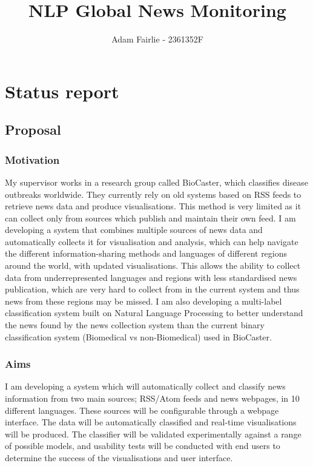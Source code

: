 \documentclass[11pt]{article}
\title{ NLP Global News Monitoring }
\author{ Adam Fairlie - 2361352F }
\begin{document}
    \maketitle
    
    
     

\section{Status report}

\subsection{Proposal}\label{proposal}

\subsubsection{Motivation}\label{motivation}
My supervisor works in a research group called BioCaster, which classifies disease outbreaks worldwide. They currently rely on old systems based on RSS feeds to retrieve news data and produce visualisations. This method is very limited as it can collect only from sources which publish and maintain their own feed. I am developing a system that combines multiple sources of news data and automatically collects it for visualisation and analysis, which can help navigate the different information-sharing methods and languages of different regions around the world, with updated visualisations. This allows the ability to collect data from underrepresented languages and regions with less standardised news publication, which are very hard to collect from in the current system and thus news from these regions may be missed. I am also developing a multi-label classification system built on Natural Language Processing to better understand the news found by the news collection system than the current binary classification system (Biomedical vs non-Biomedical) used in BioCaster.

\subsubsection{Aims}\label{aims}

I am developing a system which will automatically collect and classify news information from two main sources; RSS/Atom feeds and news webpages, in 10 different languages. These sources will be configurable through a webpage interface. The data will be automatically classified and real-time visualisations will be produced. The classifier will be validated experimentally against a range of possible models, and usability tests will be conducted with end users to determine the success of the visualisations and user interface.
\end{document}
